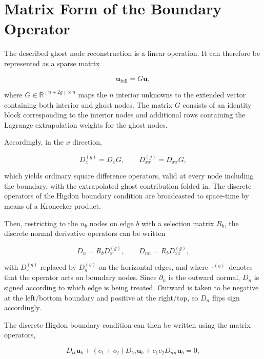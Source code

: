 \documentclass[final-report]{report-template}
\begin{document}
\section{Matrix Form of the Boundary Operator}
\label{app:higdon_mat}
The described ghost node reconstruction is a linear operation. It can therefore be represented as a sparse matrix

\begin{equation}
    \mathbf{u}_{\text{full}} = G\mathbf{u},
    \label{eq:ghost}
\end{equation}

where $G\in\mathbb{R}^{(n+2g)\times n}$ maps the $n$ interior unknowns to the extended vector containing both interior and ghost nodes. The matrix $G$ consists of an identity block corresponding to the interior nodes and additional rows containing the Lagrange extrapolation weights for the ghost nodes.

Accordingly, in the $x$ direction,

\begin{equation}
    D_x^{(g)} = D_x G, \qquad D_{xx}^{(g)} = D_{xx} G,
\end{equation}

which yields ordinary square difference operators, valid at every node including the boundary, with the extrapolated ghost contribution folded in. The discrete operators of the Higdon boundary condition are broadcasted to space-time by means of a Kronecker product.

Then, restricting to the $n_b$ nodes on edge $b$ with a selection matrix $R_b$, the discrete normal derivative operators can be written

\begin{equation}
    D_n = R_b D_x^{(g)}, \qquad D_{nn} = R_b D_{xx}^{(g)},
\end{equation}

with $D_x^{(g)}$ replaced by $D_y^{(g)}$ on the horizontal edges, and where $\cdot^{(g)}$ denotes that the operator acts on boundary nodes. Since $\partial_n$ is the outward normal, $D_n$ is signed according to which edge is being treated. Outward is taken to be negative at the left/bottom boundary and positive at the right/top, so $D_n$ flips sign accordingly.

The discrete Higdon boundary condition can then be written using the matrix operators,

\begin{equation}
    D_{tt}\mathbf{u}_b + (c_1+c_2) D_{tn}\mathbf{u}_b + c_1c_2 D_{nn}\mathbf{u}_b  = 0,
    \label{eq:mat_higdon}
\end{equation}
\end{document}
